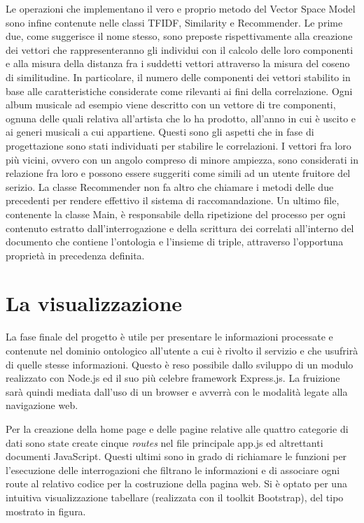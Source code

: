 \documentclass[Lau,binding=0.6cm,noexaminfo,oneside]{sapthesis}
\begin{document}
Le operazioni che implementano il vero e proprio metodo del Vector Space Model sono infine contenute nelle classi TFIDF, Similarity e Recommender. Le prime due, come suggerisce il nome stesso, sono preposte rispettivamente alla creazione dei vettori che rappresenteranno gli individui con il calcolo delle loro componenti e alla misura della distanza fra i suddetti vettori attraverso la misura del coseno di similitudine. In particolare, il numero delle componenti dei vettori  stabilito in base alle caratteristiche considerate come rilevanti ai fini della correlazione. Ogni album musicale ad esempio viene descritto con un vettore di tre componenti, ognuna delle quali relativa all'artista che lo ha prodotto, all'anno in cui è uscito e ai generi musicali a cui appartiene. Questi sono gli aspetti che in fase di progettazione sono stati individuati per stabilire le correlazioni. I vettori fra loro più vicini, ovvero con un angolo compreso di minore ampiezza, sono considerati in relazione fra loro e possono essere suggeriti come simili ad un utente fruitore del serizio. La classe Recommender non fa altro che chiamare i metodi delle due precedenti per rendere effettivo il sistema di raccomandazione. Un ultimo file, contenente la classe Main, è responsabile della ripetizione del processo per ogni contenuto estratto dall'interrogazione e della scrittura dei correlati all'interno del documento che contiene l'ontologia e l'insieme di triple, attraverso l'opportuna proprietà in precedenza definita.

\section{La visualizzazione}

La fase finale del progetto è utile per presentare le informazioni processate e contenute nel dominio ontologico all'utente a cui è rivolto il servizio e che usufrirà di quelle stesse informazioni. Questo è reso possibile dallo sviluppo di un modulo realizzato con Node.js ed il suo più celebre framework Express.js. La fruizione sarà quindi mediata dall'uso di un browser e avverrà con le modalità legate alla navigazione web.\medskip

Per la creazione della home page e delle pagine relative alle quattro categorie di dati sono state create cinque \emph{routes} nel file principale app.js ed altrettanti documenti JavaScript. Questi ultimi sono in grado  di richiamare le funzioni per l'esecuzione delle interrogazioni che filtrano le informazioni e di associare ogni route al relativo codice per la costruzione della pagina web. Si è optato per una intuitiva visualizzazione tabellare (realizzata con il toolkit Bootstrap), del tipo mostrato in figura.\medskip
\end{document}
